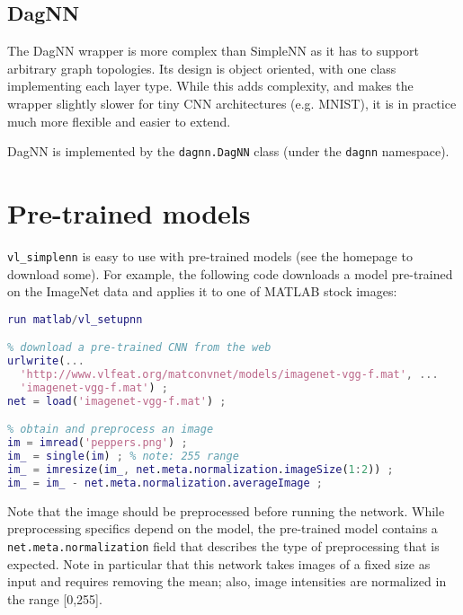\subsection{DagNN}\label{s:dagnn}

The DagNN wrapper is more complex than SimpleNN as it has to support arbitrary graph topologies. Its design is object oriented, with one class implementing each layer type. While this adds complexity, and makes the wrapper slightly slower for tiny CNN architectures (e.g. MNIST), it is in practice much more flexible and easier to extend.

DagNN is implemented by the \verb!dagnn.DagNN! class (under the \verb!dagnn! namespace).

\section{Pre-trained models}\label{s:pretrained}

\verb!vl_simplenn! is easy to use with pre-trained models (see the homepage to download some). For example, the following code downloads a model pre-trained on the ImageNet data and applies it to one of MATLAB stock images:
\begin{lstlisting}[language=Matlab]
% setup MatConvNet in MATLAB
run matlab/vl_setupnn

% download a pre-trained CNN from the web
urlwrite(...
  'http://www.vlfeat.org/matconvnet/models/imagenet-vgg-f.mat', ...
  'imagenet-vgg-f.mat') ;
net = load('imagenet-vgg-f.mat') ;

% obtain and preprocess an image
im = imread('peppers.png') ;
im_ = single(im) ; % note: 255 range
im_ = imresize(im_, net.meta.normalization.imageSize(1:2)) ;
im_ = im_ - net.meta.normalization.averageImage ;
\end{lstlisting}
Note that the image should be preprocessed before running the network. While preprocessing specifics depend on the model, the pre-trained model contains a \verb!net.meta.normalization! field that describes the type of preprocessing that is expected. Note in particular that this network takes images of a fixed size as input and requires removing the mean; also, image intensities are normalized in the range [0,255].

